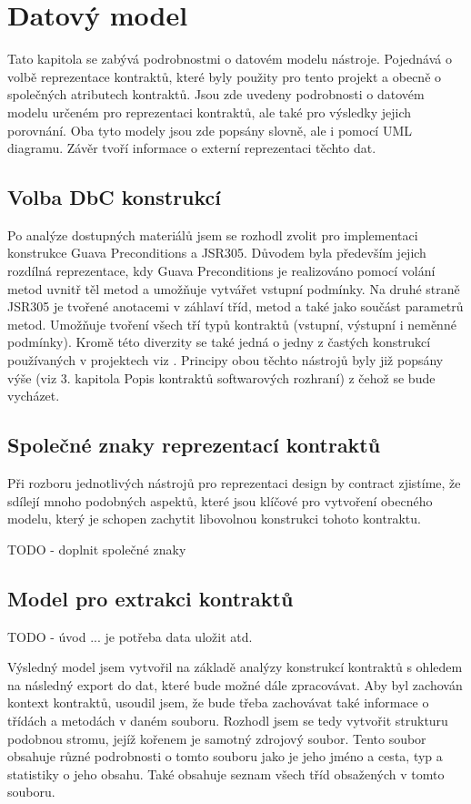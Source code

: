 \chapter{Datový model}
	Tato kapitola se zabývá podrobnostmi o datovém modelu nástroje. Pojednává o volbě reprezentace kontraktů, které byly použity pro tento projekt a obecně o společných atributech kontraktů. Jsou zde uvedeny podrobnosti o datovém modelu určeném pro reprezentaci kontraktů, ale také pro výsledky jejich porovnání. Oba tyto modely jsou zde popsány slovně, ale i pomocí UML diagramu. Závěr tvoří informace o externí reprezentaci těchto dat.

	\section{Volba DbC konstrukcí}
		Po analýze dostupných materiálů jsem se rozhodl zvolit pro implementaci konstrukce Guava Preconditions a JSR305. Důvodem byla především jejich rozdílná reprezentace, kdy Guava Preconditions je realizováno pomocí volání metod uvnitř těl metod a umožňuje vytvářet vstupní podmínky. Na druhé straně JSR305 je tvořené anotacemi v záhlaví tříd, metod a také jako součást parametrů metod. Umožňuje tvoření všech tří typů kontraktů (vstupní, výstupní i neměnné podmínky). Kromě této diverzity se také jedná o jedny z častých konstrukcí používaných v projektech viz \cite{contractsInWild}. Principy obou těchto nástrojů byly již popsány výše (viz 3. kapitola Popis kontraktů softwarových rozhraní) z čehož se bude vycházet.
				
	\section{Společné znaky reprezentací kontraktů}		
		Při rozboru jednotlivých nástrojů pro reprezentaci design by contract zjistíme, že sdílejí mnoho podobných aspektů, které jsou klíčové pro vytvoření obecného modelu, který je schopen zachytit libovolnou konstrukci tohoto kontraktu. 
		
		TODO - doplnit společné znaky
	
	\section{Model pro extrakci kontraktů}
			TODO - úvod ... je potřeba data uložit atd.			
			
			Výsledný model jsem vytvořil na základě analýzy konstrukcí kontraktů s ohledem na následný export do dat, které bude možné dále zpracovávat. Aby byl zachován kontext kontraktů, usoudil jsem, že bude třeba zachovávat také informace o třídách a metodách v daném souboru. Rozhodl jsem se tedy vytvořit strukturu podobnou stromu, jejíž kořenem je samotný zdrojový soubor. Tento soubor obsahuje různé podrobnosti o tomto souboru jako je jeho jméno a cesta, typ a statistiky o jeho obsahu. Také obsahuje seznam všech tříd obsažených v tomto souboru.\\
			
